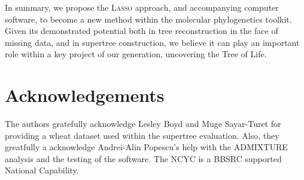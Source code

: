 In summary, we propose the \textsc{Lasso} approach, and accompanying computer
software, to become a new method within the molecular phylogenetics
toolkit. Given its demonstrated potential both in tree reconstruction in the
face of missing data, and in supertree construction, we believe it can play an
important role within a key project of our generation, uncovering the Tree of
Life.

\section{Acknowledgements}
\label{sec:acknowledgements}

The authors gratefully acknowledge Lesley Boyd and Muge Sayar-Turet for
providing a wheat dataset used within the supertree evaluation. Also, they
greatfully a acknowledge Andrei-Alin Popescu's help with the ADMIXTURE
analysis and the testing of the software. The NCYC is a BBSRC supported
National Capability.

